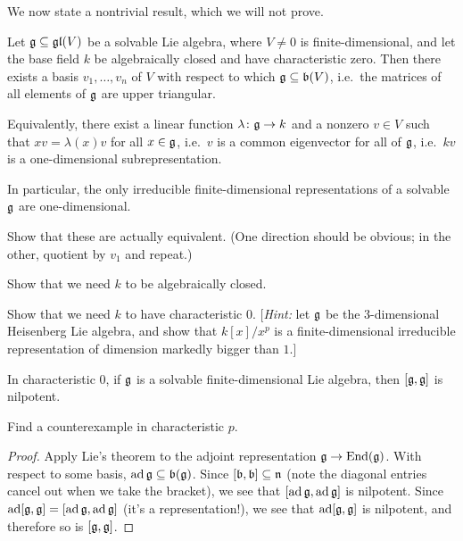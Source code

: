 We now state a nontrivial result, which we will not prove.

\begin{theorem}
Let $\mathfrak{g} \subseteq \mathfrak{gl}(V)$ be a solvable Lie algebra, where $V \neq 0$ is
finite-dimensional, and let the base field $k$ be algebraically closed and
have characteristic zero. Then there exists a basis $v_1, \dots, v_n$ of $V$
with respect to which $\mathfrak{g} \subseteq \mathfrak{b}(V)$, i.e.\ the matrices of all elements
of $\mathfrak{g}$ are upper triangular.

Equivalently, there exist a linear function $\lambda\colon \mathfrak{g} \to k$ and a
nonzero $v \in V$ such that $xv = \lambda(x)v$ for all $x \in \mathfrak{g}$, i.e.\ $v$ is
a common eigenvector for all of $\mathfrak{g}$, i.e.\ $kv$ is a one-dimensional
subrepresentation.
\end{theorem}

In particular, the only irreducible finite-dimensional representations of a
solvable $\mathfrak{g}$ are one-dimensional.

\begin{exercise}
Show that these are actually equivalent. (One direction should be obvious; in
the other, quotient by $v_1$ and repeat.)
\end{exercise}

\begin{exercise}
Show that we need $k$ to be algebraically closed.

Show that we need $k$ to have characteristic $0$. [\emph{Hint:} let $\mathfrak{g}$ be
the $3$-dimensional Heisenberg Lie algebra, and show that $k[x]/x^p$ is a
finite-dimensional irreducible representation of dimension markedly bigger
than $1$.]
\end{exercise}

\begin{corollary}
In characteristic $0$, if $\mathfrak{g}$ is a solvable finite-dimensional Lie algebra,
then $[\mathfrak{g}, \mathfrak{g}]$ is nilpotent.
\end{corollary}

\begin{exercise}
Find a counterexample in characteristic $p$.
\end{exercise}

\begin{proof}
Apply Lie's theorem to the adjoint representation $\mathfrak{g} \to \operatorname{End}(\mathfrak{g})$. With
respect to some basis, $\operatorname{ad} \mathfrak{g} \subseteq \mathfrak{b}(\mathfrak{g})$. Since $[\mathfrak{b}, \mathfrak{b}] \subseteq \mathfrak{n}$
(note the diagonal entries cancel out when we take the bracket), we see that
$[\operatorname{ad} \mathfrak{g}, \operatorname{ad} \mathfrak{g}]$ is nilpotent. Since $\operatorname{ad}[\mathfrak{g}, \mathfrak{g}] = [\operatorname{ad} \mathfrak{g}, \operatorname{ad} \mathfrak{g}]$ (it's a
representation!), we see that $\operatorname{ad}[\mathfrak{g}, \mathfrak{g}]$ is nilpotent, and therefore so is
$[\mathfrak{g}, \mathfrak{g}]$.
\end{proof}


